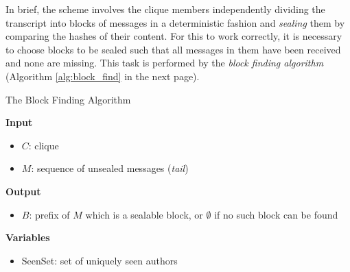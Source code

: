 \documentclass[a4paper, twoside, 12pt]{report}
\begin{document}
In brief, the scheme involves the clique members independently dividing the transcript into blocks of messages in a deterministic fashion and \emph{sealing} them by comparing the hashes of their content. For this to work correctly, it is necessary to choose blocks to be sealed such that all messages in them have been received and none are missing. This task is performed by the \emph{block finding algorithm} (Algorithm \ref{alg:block_find} in the next page). \\

\begin{algorithm}
\caption{The Block Finding Algorithm}
\label{alg:block_find}
\vspace{1pt}
\textbf{Input}
\begin{itemize}
    \item $C$: clique
    \item $M$: sequence of unsealed messages (\emph{tail}) \\
\end{itemize}

\textbf{Output}
\begin{itemize}
    \item $B$: prefix of $M$ which is a sealable block, or $\emptyset$ if no such block can be found \\
\end{itemize}

\textbf{Variables}
\begin{itemize}
    \item SeenSet: set of uniquely seen authors
\end{itemize}

\vspace{1pt}


\end{algorithm}
\end{document}
